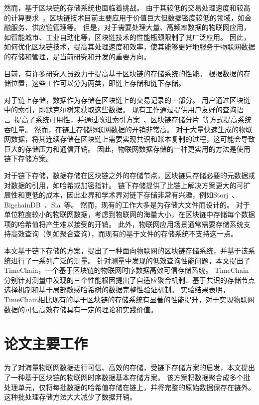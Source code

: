 然而，基于区块链的存储系统也面临着挑战。
由于其较低的交易处理速度和较高的计算要求~\cite{dorri2017towards}，区块链技术目前主要应用于价值巨大但数据密度较低的领域，如金融服务、供应链管理等。
但是，对于需要处理大量、高频率数据的物联网应用，如智能城市、工业自动化等，区块链技术的性能瓶颈限制了其广泛应用。
因此，如何优化区块链技术，提高其处理速度和效率，使其能够更好地服务于物联网数据的存储和管理，是当前研究和开发的重要方向。

目前，有许多研究人员致力于提高基于区块链的存储系统的性能。
根据数据的存储位置，这些工作可以分为两类，即链上存储和链下存储。

对于链上存储，数据作为存储在区块链上的交易记录的一部分。
用户通过区块链中的索引，即默克尔树来获取这些数据。
现有工作通过提供用户友好的查询语言~\cite{zhu2019sebdb,xu2019vchain,wang2022vchain+}提高了系统可用性，并通过改进索引方案~\cite{li2023lvmt,zhang2024cole}、区块链存储分片~\cite{zamani2018rapidchain,hong2023gridb,el2019blockchaindb}等方式提高系统吞吐量。
然而，在链上存储物联网数据的开销非常高。
对于大量快速生成的物联网数据，将其连续存储在区块链上需要实现共识和账本复制的过程，这可能会导致巨大的存储压力和通信开销。
因此，物联网数据存储的一种更实用的方法是使用链下存储方案。

对于链下存储，数据存储在区块链之外的存储节点，区块链只存储必要的元数据或对数据的引用，如哈希或加密指针。
链下存储提供了比链上解决方案更大的可扩展性和更低的成本，因此业界和学术界对链下存储非常有兴趣，例如Storj~\cite{storj2018storj}、BigchainDB~\cite{mcconaghy2016bigchaindb}、Sia~\cite{sia}等。
然而，现有的工作大多是为存储大文件而设计的。
对于单位粒度较小的物联网数据，考虑到物联网的海量大小，在区块链中存储每个数据项的哈希值将产生难以接受的开销。
此外，物联网应用场景通常需要存储系统支持高效查询（例如聚合查询），而现有的基于文件的存储系统不支持这一点。

本文基于链下存储的方案，提出了一种面向物联网的区块链存储系统，并基于该系统进行了一系列广泛的测量。
针对测量中发现的低效查询性能问题，本文提出了TimeChain，一个基于区块链的物联网时序数据高效可信存储系统。
TimeChain分别针对测量中发现的三个性能根因提出了自适应聚合机制、基于共识的存储节点选择机制和基于局部敏感哈希树的数据完整性验证机制。
实验结果表明，TimeChain相比现有的基于区块链的存储系统有显著的性能提升，对于实现物联网数据的可信高效存储具有一定的理论和实践价值。

\section{论文主要工作}
为了对海量物联网数据进行可信、高效的存储，受链下存储方案的启发，本文提出了一种基于区块链的物联网时序数据基本存储方案。
该方案将数据聚合成多个批处理单元，仅将每批数据的哈希值存储在链上，并将完整的原始数据保存在链外。
这种批处理存储方法大大减少了数据开销。

